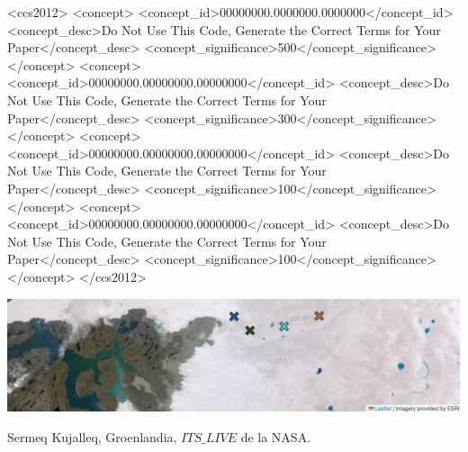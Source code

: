 \documentclass[sigconf,language=spanish]{acmart}
\begin{document}
\begin{CCSXML}
<ccs2012>
 <concept>
  <concept_id>00000000.0000000.0000000</concept_id>
  <concept_desc>Do Not Use This Code, Generate the Correct Terms for Your Paper</concept_desc>
  <concept_significance>500</concept_significance>
 </concept>
 <concept>
  <concept_id>00000000.00000000.00000000</concept_id>
  <concept_desc>Do Not Use This Code, Generate the Correct Terms for Your Paper</concept_desc>
  <concept_significance>300</concept_significance>
 </concept>
 <concept>
  <concept_id>00000000.00000000.00000000</concept_id>
  <concept_desc>Do Not Use This Code, Generate the Correct Terms for Your Paper</concept_desc>
  <concept_significance>100</concept_significance>
 </concept>
 <concept>
  <concept_id>00000000.00000000.00000000</concept_id>
  <concept_desc>Do Not Use This Code, Generate the Correct Terms for Your Paper</concept_desc>
  <concept_significance>100</concept_significance>
 </concept>
</ccs2012>
\end{CCSXML}


\begin{teaserfigure}
  \includegraphics[width=\textwidth]{sampleteaser}
  \caption{Sermeq Kujalleq, Groenlandia, $ITS\_LIVE$ de la NASA.}
  \label{fig:teaser}
\end{teaserfigure}
\end{document}
